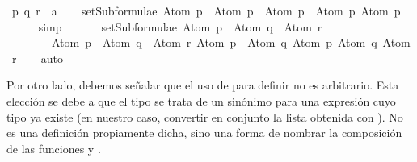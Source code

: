 \begin{isabellebody}
\ p\ q\ r\ {\isacharcolon}{\isacharcolon}\ {\isacharprime}a\isanewline
\isanewline
\ \ \isamarkupfalse%
\ {\isachardoublequoteopen}setSubformulae\ {\isacharparenleft}Atom\ p\ \isactrlbold {\isasymor}\ Atom\ p{\isacharparenright}\ {\isacharequal}\ {\isacharbraceleft}Atom\ p\ \isactrlbold {\isasymor}\ Atom\ p{\isacharcomma}\ Atom\ p{\isacharbraceright}{\isachardoublequoteclose}\isanewline
\ \ \ \ \isamarkupfalse%
\ simp\isanewline
\ \ \isanewline
\ \ \isamarkupfalse%
\ {\isachardoublequoteopen}setSubformulae\ {\isacharparenleft}{\isacharparenleft}Atom\ p\ \isactrlbold {\isasymrightarrow}\ Atom\ q{\isacharparenright}\ \isactrlbold {\isasymor}\ Atom\ r{\isacharparenright}\ {\isacharequal}\isanewline
\ \ \ \ \ \ \ \ {\isacharbraceleft}{\isacharparenleft}Atom\ p\ \isactrlbold {\isasymrightarrow}\ Atom\ q{\isacharparenright}\ \isactrlbold {\isasymor}\ Atom\ r{\isacharcomma}\ Atom\ p\ \isactrlbold {\isasymrightarrow}\ Atom\ q{\isacharcomma}\ Atom\ p{\isacharcomma}\ Atom\ q{\isacharcomma}\ Atom\ r{\isacharbraceright}{\isachardoublequoteclose}\isanewline
\ \ \isamarkupfalse%
\ auto%
\endisatagproof
{\isafoldproof}%
%
\isadelimproof
\ \ \ \isanewline
%
\endisadelimproof
{}\isamarkupfalse%
%
\begin{isamarkuptext}%
Por otro lado, debemos señalar que el uso de  para definir 
   no es arbitrario. Esta elección se debe a que el tipo 
   se trata de un sinónimo para una expresión cuyo tipo ya existe (en nuestro 
  caso, convertir en conjunto la lista obtenida con ). 
  No es una definición propiamente dicha, sino una forma de nombrar la composición de las 
  funciones  y .\\


\end{isamarkuptext}
\end{isabellebody}
